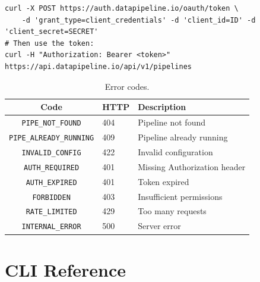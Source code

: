 \documentclass[
    language=english,
    doctype=article,
    institution=none,
]{../../omnilatex}
\begin{document}
\begin{verbatim}
curl -X POST https://auth.datapipeline.io/oauth/token \
    -d 'grant_type=client_credentials' -d 'client_id=ID' -d 'client_secret=SECRET'
# Then use the token:
curl -H "Authorization: Bearer <token>" https://api.datapipeline.io/api/v1/pipelines
\end{verbatim}

\begin{table}[htbp]
    \centering
    \caption{Error codes.}
    \label{tab:errors}
    \begin{tabular}{@{}clp{6.5cm}@{}}
        \toprule
        \textbf{Code} & \textbf{HTTP} & \textbf{Description} \\
        \midrule
        \texttt{PIPE\_NOT\_FOUND}      & 404 & Pipeline not found \\
        \texttt{PIPE\_ALREADY\_RUNNING} & 409 & Pipeline already running \\
        \texttt{INVALID\_CONFIG}       & 422 & Invalid configuration \\
        \texttt{AUTH\_REQUIRED}        & 401 & Missing Authorization header \\
        \texttt{AUTH\_EXPIRED}         & 401 & Token expired \\
        \texttt{FORBIDDEN}             & 403 & Insufficient permissions \\
        \texttt{RATE\_LIMITED}         & 429 & Too many requests \\
        \texttt{INTERNAL\_ERROR}       & 500 & Server error \\
        \bottomrule
    \end{tabular}
\end{table}

\section{CLI Reference}
\label{sec:cli-reference}
\end{document}
